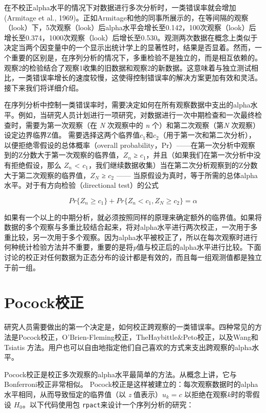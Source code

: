 \documentclass[
  letterpaper,
  DIV=11,
  numbers=noendperiod]{scrreprt}
\begin{document}
在不校正alpha水平的情况下对数据进行多次分析时，一类错误率就会增加(Armitage
et al.,
1969)。正如Armitage和他的同事所展示的，在等间隔的观察（look）下，5次观察（look）后alpha水平会增长至0.142，100次观察（look）后增长至0.374，1000次观察（look）后增长至0.530。观测两次数据在概念上类似于决定当两个因变量中的一个显示出统计学上的显著性时，结果是否显着。然而，一个重要的区别是，在序列分析的情况下，多重检验不是独立的，而是相互依赖的。观察2的检验结合了观察1收集的旧数据和观察2的新数据。这意味着与独立测试相比，一类错误率增长的速度较慢，这使得控制错误率的解决方案更加有效和灵活。接下来我们将详细介绍。

在序列分析中控制一类错误率时，需要决定如何在所有观察数据中支出的alpha水平。例如，当研究人员计划进行一项研究，对数据进行一次中期检查和一次最终检查时，需要为第一次观察（在
\emph{N} 次观察中的 \emph{n} 个）和第二次观察（第\emph{N}
次观察）设定边界临界Z值。
需要选择这两个临界值\(c_1\)和\(c_2\)（用于第一次和第二次分析），以便拒绝零假设的总体概率（overall
probability，Pr）------在第一次分析中观察到的Z分数大于第一次观察的临界值，\(Z_n\)
≥ \(c_1\)，并且（如果我们在第一次分析中没有拒绝假设，那么 \(Z_n\)
\textless{}
\(c_1\)，我们继续数据收集）当在第二次分析观察到的Z分数大于第二次观察的临界值，\(Z_N\)
≥ \(c_2\) ------
当原假设为真时，等于所需的总体alpha水平。对于有方向检验（directional
test）的公式

\[
Pr\{Z_n \geq c_1\} + Pr\{Z_n < c_1, Z_N \geq c_2\} = \alpha
\]

如果有一个以上的中期分析，就必须按照同样的原理来确定额外的临界值。如果将数据的多个观察与多重比较结合起来，将对alpha水平进行两次校正，一次用于多重比较，另一次用于多个观察。因为alpha水平被校正了，所以在每次观察时进行何种统计检验方法并不重要，重要的是将\emph{p}值与校正后的alpha水平进行比较。下面讨论的校正对任何数据为正态分布的设计都是有效的，而且每一组观测值都是独立于前一组。

\hypertarget{pocockux6821ux6b63}{%
\section{Pocock校正}\label{pocockux6821ux6b63}}

研究人员需要做出的第一个决定是，如何校正跨观察的一类错误率。四种常见的方法是Pocock校正，O'Brien-Fleming校正，TheHaybittle\&Peto校正，以及Wang和Tsiatis
方法。用户也可以自由地指定他们自己喜欢的方式来支出跨观察的alpha水平。

Pocock校正是校正多次观察的alpha水平最简单的方法。从概念上讲，它与Bonferroni校正非常相似。
Pocock校正是这样被建立的：每次观察数据时的alpha水平相同，从而导致恒定的临界值（以
\emph{z} 值表示）\(u_k = c\) 以拒绝在观察\(k\)时的零假设
\(H_0\)。以下代码使用包 \texttt{rpact}来设计一个序列分析的研究：
\end{document}
